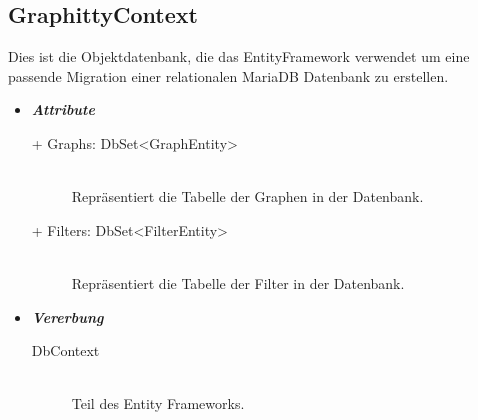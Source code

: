 \documentclass[13pt]{scrreprt}
\begin{document}
	\subsection{GraphittyContext}
	Dies ist die Objektdatenbank, die das EntityFramework verwendet um eine passende Migration einer relationalen MariaDB Datenbank zu erstellen.
	\begin{itemize}[label = {$\circ$}]
		\item {\large \textbf{\textit{Attribute}}\par}
		\begin{description}
			\item [+ Graphs: DbSet<GraphEntity>] \hfill \\ Repr\"asentiert die Tabelle der Graphen in der Datenbank.
			\item [+ Filters: DbSet<FilterEntity>] \hfill \\ Repr\"asentiert die Tabelle der Filter in der Datenbank.
		\end{description}
		\item {\large \textbf{\textit{Vererbung}}\par}
		\begin{description}
			\item [DbContext] \hfill \\ Teil des Entity Frameworks.
		\end{description}
	\end{itemize}
	
\end{document}
